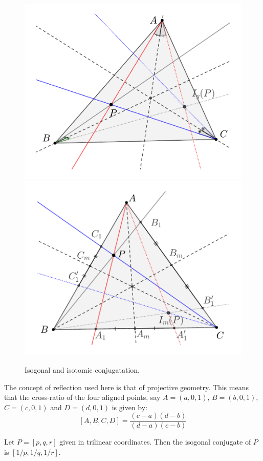 		\begin{figure}
	    \centering
	    \includegraphics[scale=0.35]{zappA/pics/pics-appA_180-isogonal.pdf}
	     \includegraphics[scale=0.4]{zappA/pics/pics-appA_190-isotomic.pdf}
	    \caption{Isogonal and isotomic conjugatation.}
	    \label{fig:appA-isotomic-isogonal}
	\end{figure}

	 \begin{remark}
 The concept of reflection used here is that of projective geometry. This means that the cross-ratio of the four aligned points, say $A=( a,0,1)$, $B=(b,0,1)$, $C=(c,0,1)$ and $D=(d,0,1)$ is given by:
 \[ [A,B,C,D]=\frac{(c-a)(d-b)}{(d-a)(c-b)}\]
 \end{remark}
	\begin{proposition}
	Let $P=[p,q,r]$ given in trilinear coordinates. Then the isogonal conjugate of $P$ is $[1/p,1/q,1/r]$.
	\end{proposition}
	
